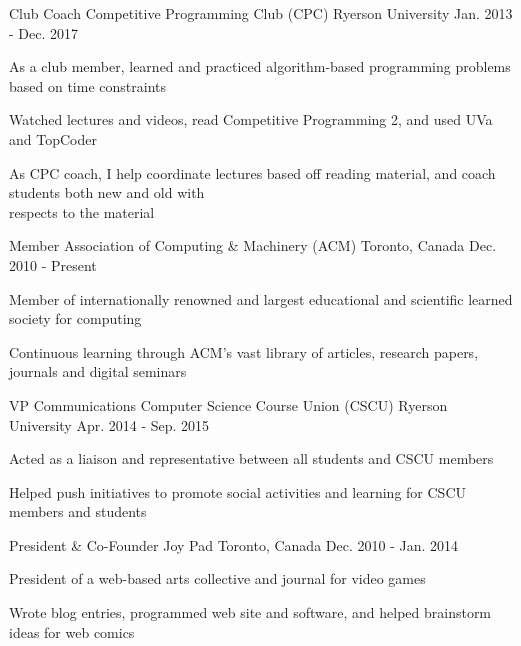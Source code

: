 \begin{cventries}
   \cventry
    {Club Coach}
    {Competitive Programming Club (CPC)}
    {Ryerson University}
    {Jan. 2013 - Dec. 2017}
    {
      \begin{cvitems}
        \item {As a club member, learned and practiced algorithm-based programming problems based on time constraints}
        \item {Watched lectures and videos, read Competitive Programming 2, and used UVa and TopCoder}
        \item {As CPC coach, I help coordinate lectures based off reading material, and coach students both new and old with \\respects to the material}
      \end{cvitems}
    }
   \cventry
    {Member}
    {Association of Computing \& Machinery (ACM)}
    {Toronto, Canada}
    {Dec. 2010 - Present}
    {
      \begin{cvitems}
        \item {Member of internationally renowned and largest educational and scientific learned society for computing}
        \item {Continuous learning through ACM's vast library of articles, research papers, journals and digital seminars}
      \end{cvitems}
    }
  \cventry
    {VP Communications}
    {Computer Science Course Union (CSCU)}
    {Ryerson University}
    {Apr. 2014 - Sep. 2015}
    {
      \begin{cvitems}
        \item {Acted as a liaison and representative between all students and CSCU members}
        \item {Helped push initiatives to promote social activities and learning for CSCU members and students}
      \end{cvitems}
      }
  \cventry		
  	{President \& Co-Founder}		
  	{Joy Pad}		
  	{Toronto, Canada}		
  	{Dec. 2010 - Jan. 2014}		
  	{		
    	\begin{cvitems}		
      	\item {President of a web-based arts collective and journal for video games}		
      	\item {Wrote blog entries, programmed web site and software, and helped brainstorm ideas for web comics}		
    \end{cvitems}		
   }
\end{cventries}